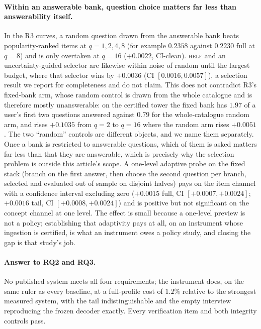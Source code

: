 \documentclass[manuscript,screen]{acmart}
\begin{document}
\paragraph{Within an answerable bank, question choice matters far less than answerability itself.} In the R3 curves, a random question drawn from the answerable bank beats popularity-ranked items at $q{=}1,2,4,8$ (for example $0.2358$ against $0.2230$ full at $q{=}8$) and is only overtaken at $q{=}16$ ($+0.0022$, CI-clean). \textsc{helf} and an uncertainty-guided selector are likewise within noise of random until the largest budget, where that selector wins by $+0.0036$ (CI $[0.0016,0.0057]$), a selection result we report for completeness and do not claim. This does not contradict R3's fixed-bank arm, whose random control is drawn from the whole catalogue and is therefore mostly unanswerable: on the certified tower the fixed bank has $1.97$ of a user's first two questions answered against $0.79$ for the whole-catalogue random arm, and rises $+0.1035$ from $q{=}2$ to $q{=}16$ where the random arm rises $+0.0051$. The two ``random'' controls are different objects, and we name them separately. Once a bank is restricted to answerable questions, which of them is asked matters far less than that they are answerable, which is precisely why the selection problem is outside this article's scope. A one-level adaptive probe on the fixed stack (branch on the first answer, then choose the second question per branch, selected and evaluated out of sample on disjoint halves) pays on the item channel with a confidence interval excluding zero ($+0.0015$ full, CI $[+0.0007,+0.0024]$; $+0.0016$ tail, CI $[+0.0008,+0.0024]$) and is positive but not significant on the concept channel at one level. The effect is small because a one-level preview is not a policy; establishing that adaptivity pays at all, on an instrument whose ingestion is certified, is what an instrument owes a policy study, and closing the gap is that study's job.

\paragraph{Answer to RQ2 and RQ3.} No published system meets all four requirements; the instrument does, on the same ruler as every baseline, at a full-profile cost of $1.2\%$ relative to the strongest measured system, with the tail indistinguishable and the empty interview reproducing the frozen decoder exactly. Every verification item and both integrity controls pass.
\end{document}
